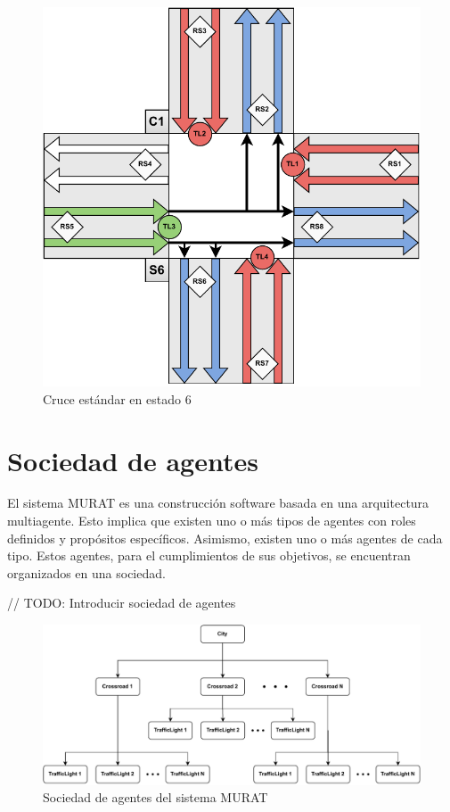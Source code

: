 \begin{figure}[H]
    \centering
    \includegraphics[width=1\linewidth]{text/image/DCruc-CE-Estado6.pdf}
    \caption{Cruce estándar en estado 6}
    \label{fig:cruce_estandar_estado_6}
\end{figure}

\newpage
\section{Sociedad de agentes}
El sistema MURAT es una construcción software basada en una arquitectura multiagente. Esto implica que existen uno o más tipos de agentes con roles definidos y propósitos específicos. Asimismo, existen uno o más agentes de cada tipo. Estos agentes, para el cumplimientos de sus objetivos, se encuentran organizados en una sociedad.

// TODO: Introducir sociedad de agentes

\begin{figure}[H]
    \centering
    \includegraphics[width=1\linewidth]{text/image/DAgen-Sociedad_de_agentes.pdf}
    \caption{Sociedad de agentes del sistema MURAT}
    \label{fig:sociedad_de_agentes}
\end{figure}

